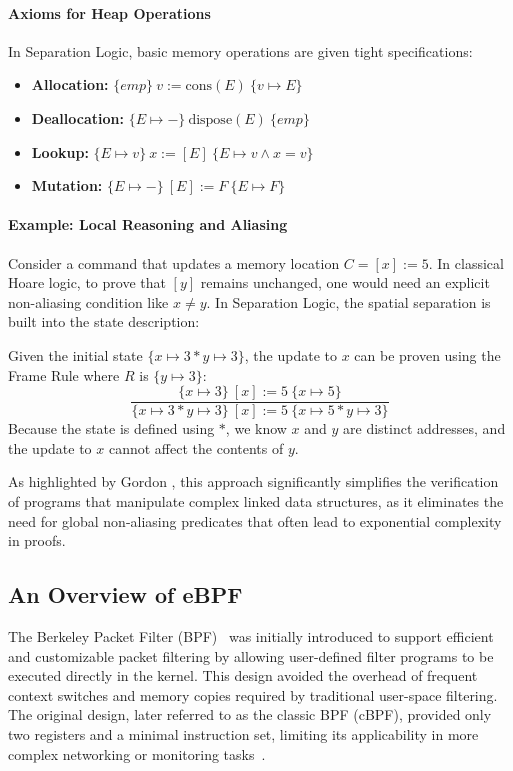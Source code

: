 \documentclass[sigconf]{acmart}
\begin{document}
\paragraph{Axioms for Heap Operations}
In Separation Logic, basic memory operations are given tight specifications:
\begin{itemize}
    \item \textbf{Allocation:} $\{emp\} \ v := \text{cons}(E) \ \{v \mapsto E\}$
    \item \textbf{Deallocation:} $\{E \mapsto -\} \ \text{dispose}(E) \ \{emp\}$
    \item \textbf{Lookup:} $\{E \mapsto v\} \ x := [E] \ \{E \mapsto v \land x=v\}$
    \item \textbf{Mutation:} $\{E \mapsto -\} \ [E] := F \ \{E \mapsto F\}$
\end{itemize}

\paragraph{Example: Local Reasoning and Aliasing}
Consider a command that updates a memory location $C = [x] := 5$. In classical Hoare logic, to prove that $[y]$ remains unchanged, one would need an explicit non-aliasing condition like $x \neq y$. In Separation Logic, the spatial separation is built into the state description:
\begin{example}
Given the initial state $\{x \mapsto 3 \ast y \mapsto 3\}$, the update to $x$ can be proven using the Frame Rule where $R$ is $\{y \mapsto 3\}$:
\[
\frac{\{x \mapsto 3\} \ [x] := 5 \ \{x \mapsto 5\}}{\{x \mapsto 3 \ast y \mapsto 3\} \ [x] := 5 \ \{x \mapsto 5 \ast y \mapsto 3\}}
\]
Because the state is defined using $\ast$, we know $x$ and $y$ are distinct addresses, and the update to $x$ cannot affect the contents of $y$.
\end{example}

As highlighted by Gordon \cite{gordon2014hoare}, this approach significantly simplifies the verification of programs that manipulate complex linked data structures, as it eliminates the need for global non-aliasing predicates that often lead to exponential complexity in proofs.

\subsection{An Overview of eBPF}

The Berkeley Packet Filter (BPF)~\cite{mccanne93} was initially introduced to support efficient and customizable packet filtering by allowing user-defined filter programs to be executed directly in the kernel. This design avoided the overhead of frequent context switches and memory copies required by traditional user-space filtering. The original design, later referred to as the classic BPF (cBPF), provided only two registers and a minimal instruction set, limiting its applicability in more complex networking or monitoring tasks~\cite{kernel2024bpfdoc}.
\end{document}
